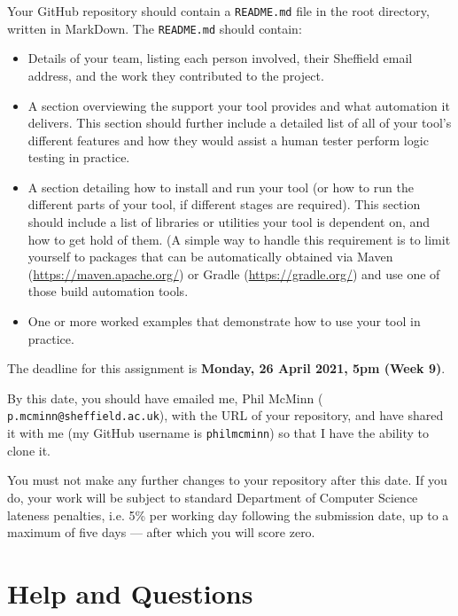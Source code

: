 Your GitHub repository should contain a {\tt README.md} file in the root
directory, written in MarkDown. The {\tt README.md} should contain:

\begin{itemize}
    \item Details of your team, listing each person involved, their Sheffield
    email address, and the work they contributed to the project. 
    
    \item A section overviewing the support your tool provides and what
    automation it delivers. This section should further include a detailed list
    of all of your tool's different features and how they would assist a human
    tester perform logic testing in practice.

    \item A section detailing how to install and run your tool (or how to run
    the different parts of your tool, if different stages are required). This
    section should include a list of libraries or utilities your tool is
    dependent on, and how to get hold of them. (A simple way to handle this
    requirement is to limit yourself to packages that can be automatically
    obtained via Maven (\url{https://maven.apache.org/}) or Gradle
    (\url{https://gradle.org/}) and use one of those build automation tools. 

    \item One or more worked examples that demonstrate how to use your tool in
    practice. 
\end{itemize}

The deadline for this assignment is {\bf Monday, 26 April 2021, 5pm (Week 9)}.

By this date, you should have emailed me, Phil McMinn ({\tt
p.mcminn@sheffield.ac.uk}), with the URL of your repository, and have shared it
with me (my GitHub username is {\tt philmcminn}) so that I have the ability to
clone it.

You must not make any further changes to your repository after this date. If you
do, your work will be subject to standard Department of Computer Science
lateness penalties, i.e. 5\% per working day following the submission date, up
to a maximum of five days --- after which you will score zero.


\section{Help and Questions}

